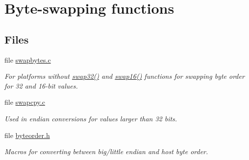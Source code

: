\hypertarget{group__util__byteorder}{\section{Byte-\/swapping functions}
\label{group__util__byteorder}
}
\subsection*{Files}
\begin{DoxyCompactItemize}
\item 
file \hyperlink{swapbytes_8c}{swapbytes.\-c}
\begin{DoxyCompactList}\small\item\em For platforms without \hyperlink{group__hal__hcs08_ga5bdbc60a02db00841f567d1ade52f877}{swap32()} and \hyperlink{group__hal__hcs08_ga490209526172903494641bdac55db46e}{swap16()} functions for swapping byte order for 32 and 16-\/bit values. \end{DoxyCompactList}\item 
file \hyperlink{swapcpy_8c}{swapcpy.\-c}
\begin{DoxyCompactList}\small\item\em Used in endian conversions for values larger than 32 bits. \end{DoxyCompactList}\item 
file \hyperlink{byteorder_8h}{byteorder.\-h}
\begin{DoxyCompactList}\small\item\em Macros for converting between big/little endian and host byte order. \end{DoxyCompactList}\end{DoxyCompactItemize}
